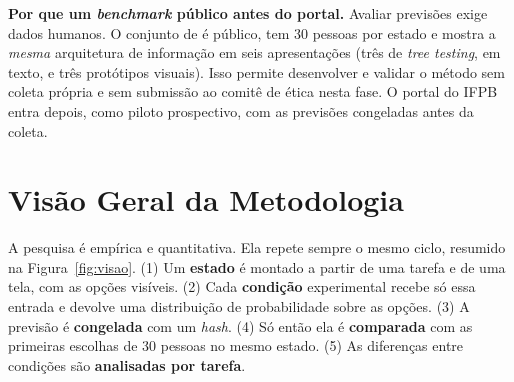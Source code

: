 \documentclass[12pt,oneside,a4paper,chapter=TITLE,english,brazil]{abntex2}
\begin{document}
\textbf{Por que um \textit{benchmark} público antes do portal.} Avaliar previsões exige dados humanos. O conjunto de  é público, tem 30 pessoas por estado e mostra a \emph{mesma} arquitetura de informação em seis apresentações (três de \textit{tree testing}, em texto, e três protótipos visuais). Isso permite desenvolver e validar o método sem coleta própria e sem submissão ao comitê de ética nesta fase. O portal do IFPB entra depois, como piloto prospectivo, com as previsões congeladas antes da coleta.

\section{Visão Geral da Metodologia}
\label{sec:visaogeral}

A pesquisa é empírica e quantitativa. Ela repete sempre o mesmo ciclo, resumido na Figura~\ref{fig:visao}. (1) Um \textbf{estado} é montado a partir de uma tarefa e de uma tela, com as opções visíveis. (2) Cada \textbf{condição} experimental recebe só essa entrada e devolve uma distribuição de probabilidade sobre as opções. (3) A previsão é \textbf{congelada} com um \textit{hash}. (4) Só então ela é \textbf{comparada} com as primeiras escolhas de 30 pessoas no mesmo estado. (5) As diferenças entre condições são \textbf{analisadas por tarefa}.
\end{document}
